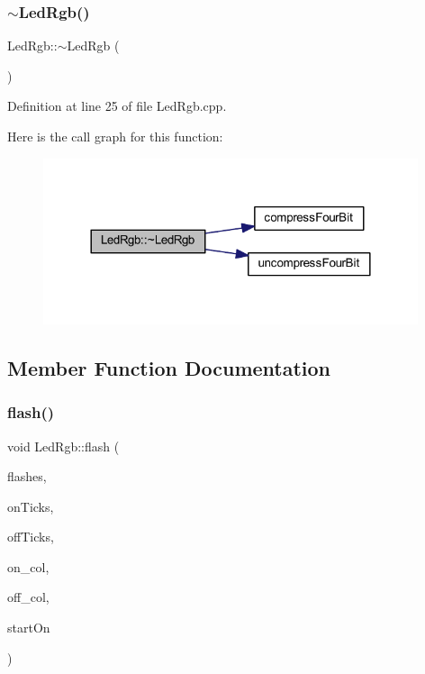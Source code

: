 \subsubsection{\texorpdfstring{$\sim$\+Led\+Rgb()}{~LedRgb()}}
{\footnotesize\ttfamily Led\+Rgb\+::$\sim$\+Led\+Rgb (\begin{DoxyParamCaption}{ }\end{DoxyParamCaption})}



Definition at line 25 of file Led\+Rgb.\+cpp.

Here is the call graph for this function\+:
\nopagebreak
\begin{figure}[H]
\begin{center}
\leavevmode
\includegraphics[width=312pt]{class_led_rgb_a4fac00de3a6801fd9da322eab7e04765_cgraph}
\end{center}
\end{figure}


\subsection{Member Function Documentation}
\mbox{\label{class_led_rgb_a8d81b6020efb6e5f786542451d4dffbc}} 
\subsubsection{\texorpdfstring{flash()}{flash()}}
{\footnotesize\ttfamily void Led\+Rgb\+::flash (\begin{DoxyParamCaption}\item[{unsigned char}]{flashes,  }\item[{unsigned char}]{on\+Ticks,  }\item[{unsigned char}]{off\+Ticks,  }\item[{\hyperlink{class_led_rgb_af328c665510f921f0dfed643f939087b}{Led\+Rgb\+Colour}}]{on\+\_\+col,  }\item[{\hyperlink{class_led_rgb_af328c665510f921f0dfed643f939087b}{Led\+Rgb\+Colour}}]{off\+\_\+col,  }\item[{bool}]{start\+On }\end{DoxyParamCaption})}



